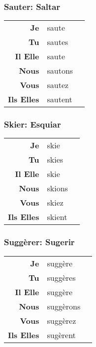 \documentclass{subfiles}
\begin{document}
\begin{multicols*}{3}
        \subsubsection{Sauter: Saltar}
            \begin{tabular}{r l r}
                \textbf{Je}        & saute   &\\
                \textbf{Tu}        & sautes  &\\
                \textbf{Il Elle}   & saute   &\\
                \textbf{Nous}      & sautons &\\
                \textbf{Vous}      & sautez  &\\
                \textbf{Ils Elles} & sautent &
            \end{tabular} 

        \subsubsection{Skier: Esquiar}
            \begin{tabular}{r l r}
                \textbf{Je}        & skie   &\\
                \textbf{Tu}        & skies  &\\
                \textbf{Il Elle}   & skie   &\\
                \textbf{Nous}      & skions &\\
                \textbf{Vous}      & skiez  &\\
                \textbf{Ils Elles} & skient &
            \end{tabular}

        \subsubsection{Suggèrer: Sugerir}
            \begin{tabular}{r l r}
                \textbf{Je}        & suggère   &\\
                \textbf{Tu}        & suggères  &\\
                \textbf{Il Elle}   & suggère   &\\
                \textbf{Nous}      & suggèrons &\\
                \textbf{Vous}      & suggèrez  &\\
                \textbf{Ils Elles} & sugèrent  &
            \end{tabular}


\end{multicols*}
\end{document}
